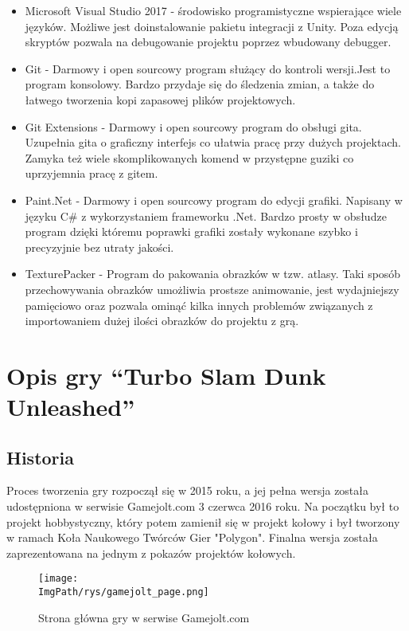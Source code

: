 \documentclass[a4paper,12pt,twoside,openany]{report}
\newcommand{\ImgPath}{.}
\begin{document}
\begin{itemize}
    \item Microsoft Visual Studio 2017 - środowisko programistyczne wspierające wiele języków. Możliwe jest doinstalowanie pakietu integracji z Unity. Poza edycją skryptów pozwala na debugowanie projektu poprzez wbudowany debugger.
    \item Git - Darmowy i open sourcowy program służący do kontroli wersji.Jest to program konsolowy. Bardzo przydaje się do śledzenia zmian, a także do łatwego tworzenia kopi zapasowej plików projektowych.
    \item Git Extensions - Darmowy i open sourcowy program do obsługi gita. Uzupełnia gita o graficzny interfejs co ułatwia pracę przy dużych projektach. Zamyka też wiele skomplikowanych komend w przystępne guziki co uprzyjemnia pracę z gitem.
    \item Paint.Net - Darmowy i open sourcowy program do edycji grafiki. Napisany w języku C\# z wykorzystaniem frameworku .Net. Bardzo prosty w obsłudze program dzięki któremu poprawki grafiki zostały wykonane szybko i precyzyjnie bez utraty jakości.
    \item TexturePacker - Program do pakowania obrazków w tzw. atlasy. Taki sposób przechowywania obrazków umożliwia prostsze animowanie, jest wydajniejszy pamięciowo oraz pozwala ominąć kilka innych problemów związanych z importowaniem dużej ilości obrazków do projektu z grą.
\end{itemize}

\chapter{Opis gry “Turbo Slam Dunk Unleashed”}

\section{Historia}

Proces tworzenia gry rozpoczął się w 2015 roku, a jej pełna wersja została udostępniona w serwisie Gamejolt.com 3 czerwca 2016 roku\cite{gamejolt_page}. Na początku był to projekt hobbystyczny, który potem zamienił się w projekt kołowy i był tworzony w ramach Koła Naukowego Twórców Gier "Polygon". Finalna wersja została zaprezentowana na jednym z pokazów projektów kołowych.
\begin{figure}[!htbp]
	\begin{center}
\centering
\texttt{[image: \\ImgPath/rys/gamejolt\_page.png]}
\end{center}
	\caption{Strona główna gry w serwise Gamejolt.com}
	\label{gamejolt_page}
\end{figure}
\end{document}
